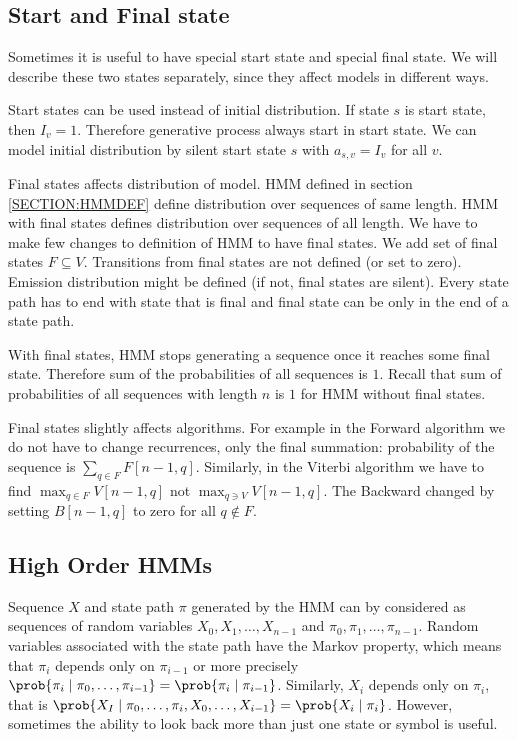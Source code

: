 

\subsection{Start and Final state}

Sometimes it is useful to have special start state and special final state. We
will describe these two states separately, since they affect models in different
ways. 

Start states can be used instead of initial distribution. If state $s$ is start
state, then $I_v=1$. Therefore generative process always start in start state.
We can model initial distribution by silent start state $s$ with $a_{s,v}=I_v$ for all $v$.

Final states affects distribution of model. HMM defined in section
\ref{SECTION:HMMDEF} define distribution over sequences of same length. HMM with
final states defines distribution over sequences of all length.  We have to make
few changes to definition of HMM to have final states.
We add set of final states $F\subseteq V$. Transitions from final states are not
defined (or set to zero). Emission distribution might be defined (if not, final
states are silent). Every state path has to end with state that is final and
final state can be only in the end of a state path.

With final states, HMM stops generating a sequence once it reaches some final
state. Therefore sum of the probabilities of all sequences is $1$. Recall
that sum of probabilities of all sequences with length $n$ is $1$ for HMM
without final states.

Final states slightly affects algorithms. For example in the Forward algorithm we do
not have to change recurrences, only the final summation: probability of the sequence is $\sum_{q\in F}F[n-1,q]$. 
Similarly, in the Viterbi algorithm
we have to find $\max_{q\in F} V[n-1,q]$ not $\max_{q\ni V} V[n-1,q]$. 
The Backward changed by setting $B[n-1,q]$ to zero for all $q\notin F$.

\subsection{High Order HMMs}

Sequence $X$ and state path $\pi$ generated by the HMM can by considered 
as sequences of random variables
$X_0,X_1,\dots, X_{n-1}$ and $\pi_0,\pi_1,\dots,\pi_{n-1}$.
Random variables associated with the state path have the Markov
property\cite{Levin2006}, which means that $\pi_i$ depends only on $\pi_{i-1}$ or
more precisely
$\prob{\pi_i\mid\pi_0,\dots,\pi_{i-1}}=\prob{\pi_i\mid\pi_{i-1}}$. Similarly,
$X_i$ depends only on $\pi_i$, that is
$\prob{X_I\mid\pi_0,\dots,\pi_i,X_0,\dots,X_{i-1}}=\prob{X_i\mid\pi_i}$.
However,
sometimes the  ability to look back more than just one state or symbol is useful.


